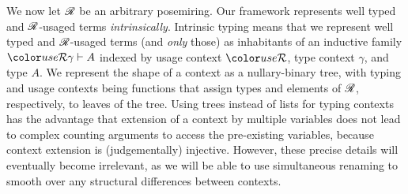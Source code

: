 We now let $\mathscr R$ be an arbitrary posemiring. Our framework represents
well typed and $\mathscr R$-usaged terms \emph{intrinsically}. Intrinsic
typing means that we represent well typed and $\mathscr R$-usaged terms
(and \emph{only} those) as inhabitants of an inductive family
$\grR\gamma \vdash A$ indexed by usage context $\grR$, type
context $\gamma$, and type $A$.
We represent the shape of a context as a nullary-binary tree, with typing and
usage contexts being functions that assign types and elements of $\mathscr R$,
respectively, to leaves of the tree.
Using trees
instead of lists for typing contexts has the advantage that extension
of a context by multiple variables does not lead to complex counting
arguments to access the pre-existing variables, because context extension is
(judgementally) injective.
However, these precise details will eventually become irrelevant, as we will be
able to use simultaneous renaming to smooth over any structural differences
between contexts.

